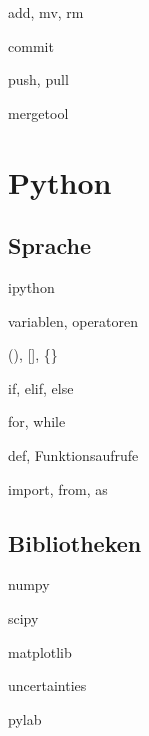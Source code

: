\documentclass[t]{beamer}
\begin{document}
      \begin{frame}{add, mv, rm}
      \end{frame}
      
      \begin{frame}{commit}
      \end{frame}
      
      \begin{frame}{push, pull}
      \end{frame}
      
      \begin{frame}{mergetool}
      \end{frame}

  \section{Python}
    \subsection{Sprache}
      \begin{frame}{ipython}
      \end{frame}
      
      \begin{frame}{variablen, operatoren}
      \end{frame}
      
      \begin{frame}{(), [], \{\}}
      \end{frame}
      
      \begin{frame}{if, elif, else}
      \end{frame}
      
      \begin{frame}{for, while}
      \end{frame}
      
      \begin{frame}{def, Funktionsaufrufe}
      \end{frame}
      
      \begin{frame}{import, from, as}
      \end{frame}
    
    \subsection{Bibliotheken}
      \begin{frame}{numpy}
      \end{frame}
      
      \begin{frame}{scipy}
      \end{frame}
      
      \begin{frame}{matplotlib}
      \end{frame}
      
      \begin{frame}{uncertainties}
      \end{frame}
      
      \begin{frame}{pylab}
      \end{frame}
\end{document}

